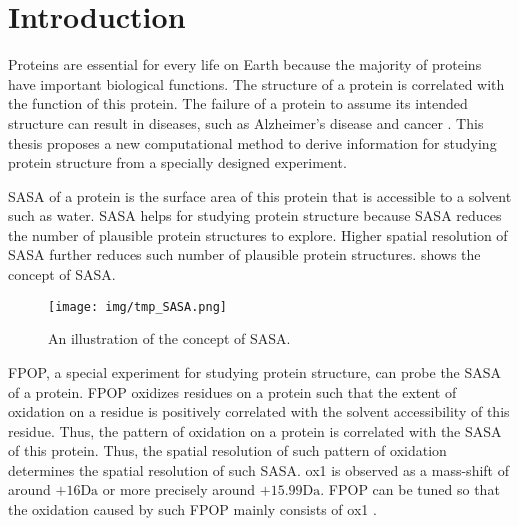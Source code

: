 
\chapter{Introduction}
\label{chap:intro}
\glsresetall

Proteins are essential for every life on Earth because the majority of proteins have important biological functions. 
The structure of a protein is correlated with the function of this protein.
The failure of a protein to assume its intended structure can result in diseases, such as Alzheimer's disease and cancer
		\cite{selkoe2004cell,porta2014cancer3d}.
This thesis proposes a new computational method to derive information for studying protein structure from a specially designed experiment.

\Gls{SASA} of a protein is the surface area of this protein that is accessible to a solvent such as water.
\Gls{SASA} helps for studying protein structure because \gls{SASA} reduces the number of plausible protein structures to explore.
Higher spatial resolution of \gls{SASA} further reduces such number of plausible protein structures.
 shows the concept of \gls{SASA}.
\begin{figure}	
\begin{center}
\texttt{[image: img/tmp\_SASA.png]}	
\end{center}
\caption[An illustration of the concept of \gls{SASA}.]{
         An illustration of the concept of \gls{SASA}. 
\label{fig:intro:SASA}}
\end{figure}
\Gls{FPOP}, a special experiment for studying protein structure, can probe the \gls{SASA} of a protein. 
\Gls{FPOP} oxidizes residues on a protein such that the extent of oxidation on a residue is positively correlated with the solvent accessibility of this residue.
Thus, the pattern of oxidation on a protein is correlated with the \gls{SASA} of this protein.
Thus, the spatial resolution of such pattern of oxidation determines the spatial resolution of such \gls{SASA}. 
\Gls{ox1} is observed as a mass-shift of around \(+16\si{\dalton}\) or more precisely around \(+15.99\si{\dalton}\).
\Gls{FPOP} can be tuned so that the oxidation caused by such \gls{FPOP} mainly consists of \gls{ox1} \cite{gau2011advancement}.


